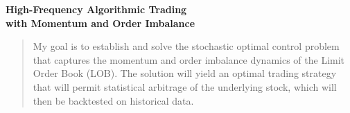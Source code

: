 \documentclass[12pt]{article}
\begin{document}
\mymascheader
\pagestyle{plain}
{\begin{center} {\large {\bf High-Frequency Algorithmic Trading \\ with Momentum and Order Imbalance}} \end{center}}
\bigskip


\begin{quote}
My goal is to establish and solve the stochastic optimal control problem that 
captures the momentum and order imbalance dynamics of the Limit Order Book 
(LOB). The solution will yield an optimal trading strategy that will permit
statistical arbitrage of the underlying stock, which will then be backtested on
historical data.
\end{quote}
\end{document}
